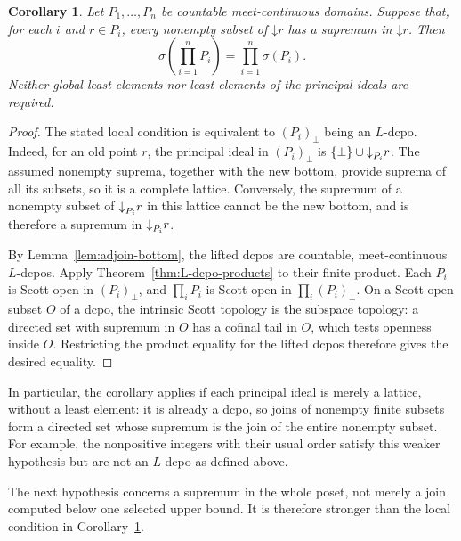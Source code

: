 \documentclass[10pt,a4paper]{amsart}
\newtheorem{corollary}[theorem]{Corollary}
\numberwithin{equation}{section}
\newcommand{\down}[1]{\mathord{\downarrow}#1}
\newcommand{\Sc}{\sigma}
\begin{document}
\begin{corollary}\label{cor:bottom-free-local-products}
Let $P_1,\ldots,P_n$ be countable meet-continuous domains. Suppose that, for each $i$ and $r\in P_i$, every nonempty subset of $\down r$ has a supremum in $\down r$. Then
\[
 \Sc\!\left(\prod_{i=1}^{n}P_i\right)
 =\prod_{i=1}^{n}\Sc(P_i).
\]
Neither global least elements nor least elements of the principal ideals are required.
\end{corollary}
\begin{proof}
The stated local condition is equivalent to $(P_i)_\bot$ being an $L$-dcpo. Indeed, for an old point $r$, the principal ideal in $(P_i)_\bot$ is $\{\bot\}\cup\down_{P_i}r$. The assumed nonempty suprema, together with the new bottom, provide suprema of all its subsets, so it is a complete lattice. Conversely, the supremum of a nonempty subset of $\down_{P_i}r$ in this lattice cannot be the new bottom, and is therefore a supremum in $\down_{P_i}r$.

By Lemma~\ref{lem:adjoin-bottom}, the lifted dcpos are countable, meet-continuous $L$-dcpos. Apply Theorem~\ref{thm:L-dcpo-products} to their finite product. Each $P_i$ is Scott open in $(P_i)_\bot$, and $\prod_iP_i$ is Scott open in $\prod_i(P_i)_\bot$. On a Scott-open subset $O$ of a dcpo, the intrinsic Scott topology is the subspace topology: a directed set with supremum in $O$ has a cofinal tail in $O$, which tests openness inside $O$. Restricting the product equality for the lifted dcpos therefore gives the desired equality.
\end{proof}

In particular, the corollary applies if each principal ideal is merely a lattice, without a least element: it is already a dcpo, so joins of nonempty finite subsets form a directed set whose supremum is the join of the entire nonempty subset. For example, the nonpositive integers with their usual order satisfy this weaker hypothesis but are not an $L$-dcpo as defined above.

The next hypothesis concerns a supremum in the whole poset, not merely a join computed below one selected upper bound. It is therefore stronger than the local condition in Corollary~\ref{cor:bottom-free-local-products}.
\end{document}
